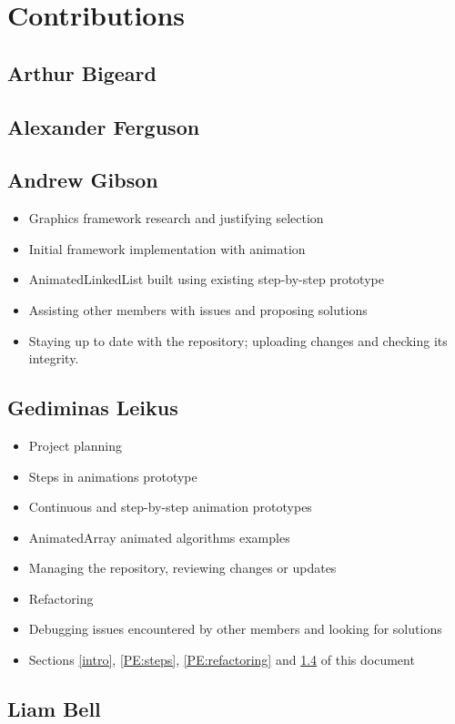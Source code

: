 \documentclass{l3proj}
\begin{document}
\section{Contributions}
\subsection{Arthur Bigeard}
\subsection{Alexander Ferguson}
\subsection{Andrew Gibson}
\begin{itemize}
	\item Graphics framework research and justifying selection
	\item Initial framework implementation with animation
	\item AnimatedLinkedList built using existing step-by-step prototype
	\item Assisting other members with issues and proposing solutions
	\item Staying up to date with the repository; uploading changes
and checking its integrity.
\end{itemize}
\subsection{Gediminas Leikus}
\label{Gediminas:Con}
\begin{itemize}
	\item Project planning
	\item Steps in animations prototype
	\item Continuous and step-by-step animation prototypes
	\item AnimatedArray animated algorithms examples
	\item Managing the repository, reviewing changes or updates
	\item Refactoring
	\item Debugging issues encountered by other members and looking for solutions
	\item Sections \ref{intro}, \ref{PE:steps}, \ref{PE:refactoring} and \ref{Gediminas:Con} of this document
\end{itemize}
\subsection{Liam Bell}
\end{document}
